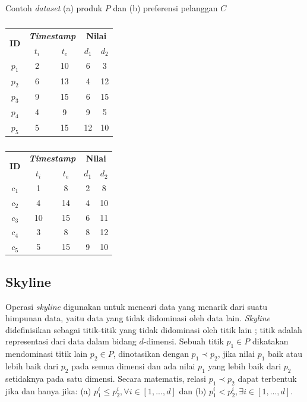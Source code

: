 \documentclass[conference]{IEEEtran}
\begin{document}
\begin{table}[H]
	\caption{Contoh \textit{dataset} (a) produk $P$ dan (b) preferensi pelanggan $C$ \label{tab:dataset}}
	\begin{subtable}{.5\linewidth}
		\small
		\centering
		\caption{}
		\begin{tabular}{|c|c|c|c|c|}
			\hline
			\multirow{2}{*}{\textbf{ID}} & \multicolumn{2}{c|}{\textbf{\textit{Timestamp}}} & \multicolumn{2}{c|}{\textbf{Nilai}} \\ \cline{2-5}
			& \textbf{$t_i$} & \textbf{$t_e$} & \textbf{$d_1$} & \textbf{$d_2$}\\ \hline \hline
			$p_1$ & 2 & 10 & 6 & 3 \\ \hline
			$p_2$ & 6 & 13 & 4 & 12 \\ \hline
			$p_3$ & 9 & 15 & 6 & 15 \\ \hline
			$p_4$ & 4 & 9 & 9 & 5 \\ \hline
			$p_5$ & 5 & 15 & 12 & 10 \\ \hline
		\end{tabular}
	\end{subtable}%
	\begin{subtable}{.5\linewidth}
		\small
		\centering
		\caption{}
		\begin{tabular}{|c|c|c|c|c|}
			\hline
			\multirow{2}{*}{\textbf{ID}} & \multicolumn{2}{c|}{\textbf{\textit{Timestamp}}} & \multicolumn{2}{c|}{\textbf{Nilai}} \\ \cline{2-5}
			& \textbf{$t_i$} & \textbf{$t_e$} & \textbf{$d_1$} & \textbf{$d_2$}\\ \hline \hline
			$c_1$ & 1 & 8 & 2 & 8 \\ \hline
			$c_2$ & 4 & 14 & 4 & 10\\ \hline
			$c_3$ & 10 & 15 & 6 & 11\\ \hline
			$c_4$ & 3 & 8 & 8 & 12\\ \hline
			$c_5$ & 5 & 15 & 9 & 10\\ \hline
		\end{tabular}
	\end{subtable} 
\end{table}

\subsection{Skyline}
Operasi \textit{skyline} digunakan untuk mencari data yang menarik dari suatu himpunan data, yaitu data yang tidak didominasi oleh data lain. \textit{Skyline} didefinisikan sebagai titik-titik yang tidak didominasi oleh titik lain \cite{skyline}; titik adalah representasi dari data dalam bidang $d$-dimensi. Sebuah titik $p_1 \in P$ dikatakan mendominasi titik lain $p_2 \in P$, dinotasikan dengan  $p_1 \prec p_2$, jika nilai $p_1$ baik atau lebih baik dari $p_2$ pada semua dimensi dan ada nilai $p_1$ yang lebih baik dari $p_2$ setidaknya pada satu dimensi. Secara matematis, relasi $p_1 \prec p_2$ dapat terbentuk jika dan hanya jika: (a) $p_1^i \leq p_2^i, \forall i \in [1, ..., d]$ dan (b) $p_1^i < p_2^i, \exists i \in [1, ..., d]$. 
\end{document}
